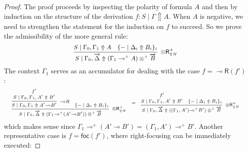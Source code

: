 \documentclass[runningheads]{llncs}
\renewcommand{\vec}{\overrightarrow}
\newcommand{\tr}{\otimes \mathsf{R}}
\newcommand{\lright}{{\multimap}\mathsf{R}}
\newcommand{\otR}{\tr}
\newcommand{\lolliR}{\lright}
\newcommand{\ot}{\otimes}
\newcommand{\lolli}{\multimap}
\newcommand{\proofbox}[1]{\begin{tabular}{l} #1 \end{tabular}}
\newcommand{\up}{\Uparrow}
\newcommand{\dn}{\Downarrow}
\newcommand{\foc}{\mathsf{foc}}
\newcommand{\focR}{\mathsf{foc_R}}
\newcommand{\blurR}{\mathsf{blur_R}}
\newcommand{\unfoc}{\mathsf{unfoc}}
\begin{document}
\begin{proof}
  The proof proceeds by inspecting the polarity of formula $A$ and then by induction on the structure of the derivation $f : S \mid \Gamma \up A$. When $A$ is negative, we need to strengthen the statement for the induction on $f$ to succeed. So we prove the admissibility of the more general rule:
  \begin{equation}
    \label{eq:genotR}
    \footnotesize
      \infer[\otR^+_{\up N}]{S \mid \Gamma_0 , \vec{\Delta} \up (\Gamma_1 \lolli^+ A) \ot^+ \vec{B}}{
      S \mid \Gamma_0,\Gamma_1 \up A
      &
      \{ - \mid \Delta_i \up B_i \}_{i}
      }
  \end{equation}
  The context $\Gamma_1$ serves as an accumulator for dealing with the case $f = \lolliR(f')$:
  \begin{equation*}\label{eq:otRlolliR}
  \scriptsize
  \begin{array}{c}
    \proofbox{\infer[\otR^+_{\up N}]{S \mid \Gamma_0 , \vec{\Delta} \up (\Gamma_1 {\lolli}^+ (A' {\lolli} B')) \ot^+ \vec{B}}{
      \infer[{\lolli}R]{S \mid \Gamma_0,\Gamma_1\up A' {\lolli} B'}{
        \deduce{S \mid \Gamma_0,\Gamma_1,A'\up B'}{f'}
        }
      &
      \{ - \mid \Delta_i \up B_i \}_{i}
    }} =
    \proofbox{
    \infer[\otR^+_{\up N}]{S \mid \Gamma_0 , \vec{\Delta} \up ((\Gamma_1,A') {\lolli}^+ B') \ot^+ \vec{B}}{
      \deduce{S \mid \Gamma_0,\Gamma_1,A' \up B'}{f'}
      & 
      \{ - \mid \Delta_i \up B_i \}_{i}
    }
    }
  \end{array}
  \end{equation*}
  which makes sense since $\Gamma_1 {\lolli}^+ (A' {\lolli} B') = (\Gamma_1,A') {\lolli}^+ B'$.
  Another representative case is $f = \foc(f')$, where right-focusing can be immediately executed:

\end{proof}
\end{document}
